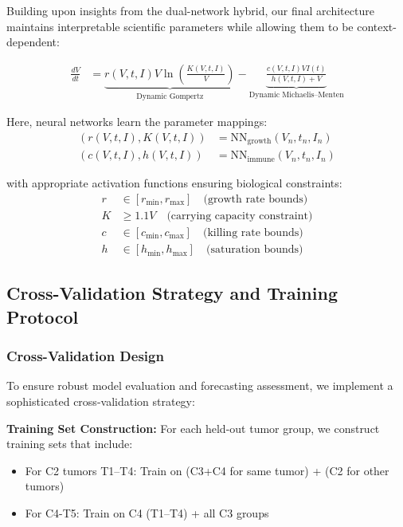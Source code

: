 \documentclass{juliacon}
\begin{document}
Building upon insights from the dual-network hybrid, our final architecture maintains interpretable scientific parameters while allowing them to be context-dependent:

\begin{align}
\frac{dV}{dt} &= \underbrace{r(V,t,I) V \ln\left(\frac{K(V,t,I)}{V}\right)}_{\text{Dynamic Gompertz}} - \underbrace{\frac{c(V,t,I) V I(t)}{h(V,t,I) + V}}_{\text{Dynamic Michaelis--Menten}}
\label{eq:pure_mechanistic_ude}
\end{align}

Here, neural networks learn the parameter mappings:
\begin{align}
(r(V,t,I), K(V,t,I)) &= \text{NN}_{\text{growth}}(V_n, t_n, I_n) \\
(c(V,t,I), h(V,t,I)) &= \text{NN}_{\text{immune}}(V_n, t_n, I_n)
\end{align}

with appropriate activation functions ensuring biological constraints:
\begin{align}
r &\in [r_{\min}, r_{\max}] \quad \text{(growth rate bounds)} \\
K &\geq 1.1V \quad \text{(carrying capacity constraint)} \\
c &\in [c_{\min}, c_{\max}] \quad \text{(killing rate bounds)} \\
h &\in [h_{\min}, h_{\max}] \quad \text{(saturation bounds)}
\end{align}

\subsection{Cross-Validation Strategy and Training Protocol}

\subsubsection{Cross-Validation Design}

To ensure robust model evaluation and forecasting assessment, we implement a sophisticated cross-validation strategy:

\textbf{Training Set Construction:} For each held-out tumor group, we construct training sets that include:
\begin{itemize}
    \item For C2 tumors T1--T4: Train on (C3+C4 for same tumor) + (C2 for other tumors)
    \item For C4-T5: Train on C4 (T1--T4) + all C3 groups
\end{itemize}
\end{document}

